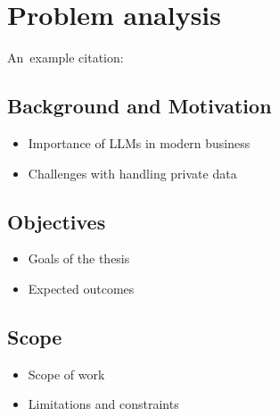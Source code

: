 \chapter{Problem analysis}

An~example citation: \cite{Andel07}

\section{Background and Motivation}
\begin{itemize}
    \item Importance of LLMs in modern business
    \item Challenges with handling private data
\end{itemize}

\section{Objectives}
\begin{itemize}
    \item Goals of the thesis
    \item Expected outcomes
\end{itemize}

\section{Scope}
\begin{itemize}
    \item Scope of work
    \item Limitations and constraints
\end{itemize}
